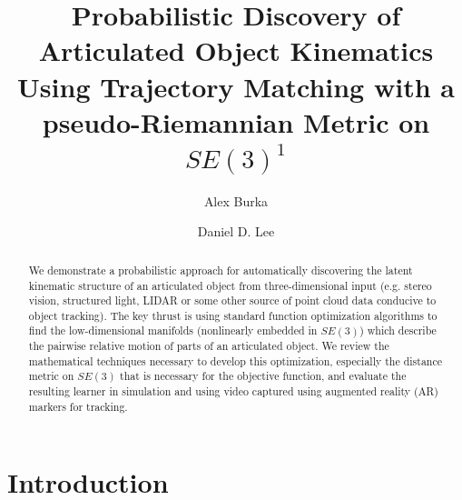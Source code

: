 \documentclass[a4paper,orivec]{llncs}
\begin{document}
\pagestyle{empty}

\mainmatter

\title{Probabilistic Discovery of Articulated Object Kinematics Using Trajectory Matching with a pseudo-Riemannian Metric on $SE(3)^1$\vspace{-.15in}}

\author{Alex Burka \and Daniel D. Lee}


\maketitle

\begin{abstract}
  \vspace{-.1in}
  We demonstrate a probabilistic approach for automatically discovering the latent kinematic structure of an articulated object from three-dimensional input (e.g. stereo vision, structured light, LIDAR or some other source of point cloud data conducive to object tracking).  The key thrust is using standard function optimization algorithms to find the low-dimensional manifolds (nonlinearly embedded in $SE(3)$) which describe the pairwise relative motion of parts of an articulated object. We review the mathematical techniques necessary to develop this optimization, especially the distance metric on $SE(3)$ that is necessary for the objective function, and evaluate the resulting learner in simulation and using video captured using augmented reality (AR) markers for tracking.
  \vspace{-.1in}
\end{abstract}

\section{Introduction}
\end{document}
